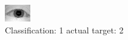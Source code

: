 \begin{figure}[h!]
\begin{center}
\includegraphics[width=0.60\columnwidth]{figures/ID948_class_1_target_2.png}
\end{center}
\caption{ Classification: 1 actual target: 2}
\label{fig:ID948_class_1_target_2}
\end{figure}
